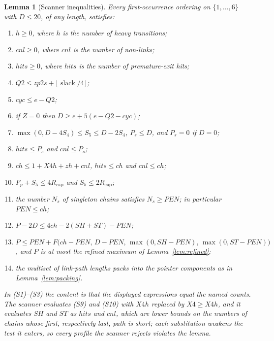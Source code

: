\documentclass[10pt]{article}
\newtheorem{lemma}[theorem]{Lemma}
\theoremstyle{remark}
\theoremstyle{plain}
\newcommand{\NCh}{\mathit{ch}}
\newcommand{\Ncyc}{\mathit{cyc}}
\newcommand{\slack}{\operatorname{slack}}
\begin{document}
\begin{lemma}[Scanner inequalities]\label{lem:scanner}
Every first-occurrence ordering on $\{1,\dots,6\}$ with $D\le 20$, of
any length, satisfies:
\begin{enumerate}
\item[(S1)] $h\ge 0$, where $h$ is the number of heavy transitions;
\item[(S2)] $\mathit{cnl}\ge 0$, where $\mathit{cnl}$ is the number of
  non-links;
\item[(S3)] $\mathit{hits}\ge 0$, where $\mathit{hits}$ is the number
  of premature-exit hits;
\item[(S4)] $Q2\le zp2s+\lfloor\slack/4\rfloor$;
\item[(S5)] $\Ncyc\le e-Q2$;
\item[(S6)] if $Z=0$ then $D\ge e+5(e-Q2-\Ncyc)$;
\item[(S7)] $\max(0,D-4S_4)\le S_5\le D-2S_4$, $P_s\le D$, and $P_s=0$
  if $D=0$;
\item[(S8)] $\mathit{hits}\le P_s$ and $\mathit{cnl}\le P_s$;
\item[(S9)] $\NCh\le 1+X4h+zh+\mathit{cnl}$, $\mathit{hits}\le\NCh$
  and $\mathit{cnl}\le\NCh$;
\item[(S10)] $F_p+S_5\le 4R_{\mathrm{cap}}$ and
  $S_5\le 2R_{\mathrm{cap}}$;
\item[(S11)] the number $N_s$ of singleton chains satisfies
  $N_s\ge\mathit{PEN}$; in particular $\mathit{PEN}\le\NCh$;
\item[(S12)] $P-2D\le 4\NCh-2(\mathit{SH}+\mathit{ST})-\mathit{PEN}$;
\item[(S13)] $P\le\mathit{PEN}+F\bigl(\NCh-\mathit{PEN},\,
  D-\mathit{PEN},\,\max(0,\mathit{SH}-\mathit{PEN}),\,
  \max(0,\mathit{ST}-\mathit{PEN})\bigr)$, and $P$ is at most the
  refined maximum of Lemma~\ref{lem:refined};
\item[(S14)] the multiset of link-path lengths packs into the pointer
  components as in Lemma~\ref{lem:packing}.
\end{enumerate}
In (S1)--(S3) the content is that the displayed expressions equal the
named counts.  The scanner evaluates (S9) and (S10) with $X4h$
replaced by $X4\ge X4h$, and it evaluates $\mathit{SH}$ and
$\mathit{ST}$ as $\mathit{hits}$ and $\mathit{cnl}$, which are lower
bounds on the numbers of chains whose first, respectively last, path is
short; each substitution weakens the test it enters, so every profile
the scanner rejects violates the lemma.
\end{lemma}
\end{document}
